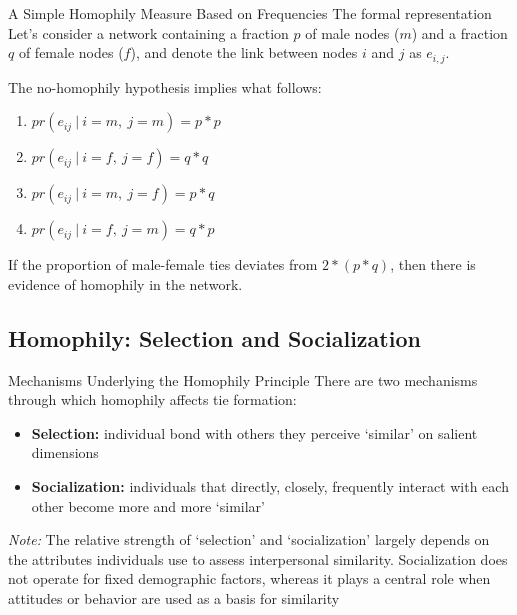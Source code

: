 \documentclass[notes, aspectratio=1610]{beamer}
\begin{document}
\begin{frame}{A Simple Homophily Measure Based on Frequencies}
	{The formal representation}
	Let's consider a network containing a fraction $p$ of male nodes ($m$) 
	and a fraction $q$ of female nodes ($f$), and denote the link between 
	nodes $i$ and $j$ as $e_{i,j}$.

	\vspace{2em}
	
	The no-homophily hypothesis implies what follows:
	\begin{enumerate}
	\item $pr(e_{ij} \ | \ i = m, \ j = m) = p * p$
	\item $pr(e_{ij} \ | \ i = f, \ j = f) = q * q$
	\item $pr(e_{ij} \ | \ i = m, \ j = f) = p * q$
	\item $pr(e_{ij} \ | \ i = f, \ j = m) = q * p$
	\end{enumerate}

	\vspace{2em}

	If the proportion of male-female ties deviates from $2*(p*q)$, then there is evidence of homophily in the network.

\end{frame}

\subsection{Homophily: Selection and Socialization}

\begin{frame}{Mechanisms Underlying the Homophily Principle}{}
	There are two mechanisms through which homophily affects tie formation:
	
	\begin{itemize}
	\item \textbf{Selection:} individual bond with others they perceive `similar' on 
	salient dimensions
	\item \textbf{Socialization:} individuals that directly, closely, frequently 
	interact with each other become more and more `similar'
	\end{itemize}

	\vspace{1em}

\small \textit{Note:} The relative strength of `selection' and `socialization' largely 
depends on the attributes individuals use to assess interpersonal similarity. 
Socialization does not operate for fixed demographic factors, whereas it 
plays a central role when attitudes or behavior are used as a basis for similarity 
\end{frame}
\end{document}

